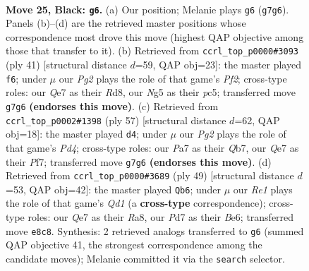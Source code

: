 \documentclass[11pt]{article}
\begin{document}
\clearpage

\begin{figure}[p]\centering
\begin{subfigure}{0.46\textwidth}\centering
\resizebox{\linewidth}{!}{%
\newchessgame
\chessboard[
  setfen={4r1k1/p1ppq1pp/5p2/6nB/1pPP4/P2Q4/2P2P1P/1R4K1 b - - 2 25},
  showmover=false,
  pgfstyle=straightmove, color=movearrow, markmove={g7-g6}
]}
\caption{}
\end{subfigure}\hfill
\begin{subfigure}{0.46\textwidth}\centering
\resizebox{\linewidth}{!}{%
\newchessgame
\chessboard[
  setfen={2kr4/1pq2p1p/p3p2B/2P1n1p1/8/8/PP2QPPP/R5K1 b - - 1 21},
  showmover=false,
  pgfstyle=straightmove, color=movearrow, markmove={f7-f6}
]}
\caption{}
\end{subfigure}
\\[4pt]
\begin{subfigure}{0.46\textwidth}\centering
\resizebox{\linewidth}{!}{%
\newchessgame
\chessboard[
  setfen={4r1k1/1q3p1p/1p4p1/p2p1n2/8/4P3/PPQ2PPP/3RB1K1 b - - 2 29},
  showmover=false,
  pgfstyle=straightmove, color=movearrow, markmove={d5-d4}
]}
\caption{}
\end{subfigure}\hfill
\begin{subfigure}{0.46\textwidth}\centering
\resizebox{\linewidth}{!}{%
\newchessgame
\chessboard[
  setfen={r2q2k1/1p2pp2/4b1p1/p6p/1P5P/P1Q1P3/4BPP1/3R2K1 b - - 1 25},
  showmover=false,
  pgfstyle=straightmove, color=movearrow, markmove={d8-b6}
]}
\caption{}
\end{subfigure}
\caption{\textbf{Move 25, Black: \texttt{g6}.} (a) Our position; Melanie plays \texttt{g6} (\texttt{g7g6}). Panels (b)--(d) are the retrieved master positions whose correspondence most drove this move (highest QAP objective among those that transfer to it). (b) Retrieved from \texttt{ccrl\_top\_p0000\#3093} (ply 41) [structural distance $d$=59, QAP obj=23]: the master played \texttt{f6}; under $\mu$ our \emph{Pg2} plays the role of that game's \emph{Pf2}; cross-type roles: our \emph{Q}e7 as their \emph{R}d8, our \emph{N}g5 as their \emph{p}c5; transferred move \texttt{g7g6} \textbf{(endorses this move)}. (c) Retrieved from \texttt{ccrl\_top\_p0002\#1398} (ply 57) [structural distance $d$=62, QAP obj=18]: the master played \texttt{d4}; under $\mu$ our \emph{Pg2} plays the role of that game's \emph{Pd4}; cross-type roles: our \emph{P}a7 as their \emph{Q}b7, our \emph{Q}e7 as their \emph{P}f7; transferred move \texttt{g7g6} \textbf{(endorses this move)}. (d) Retrieved from \texttt{ccrl\_top\_p0000\#3689} (ply 49) [structural distance $d$=53, QAP obj=42]: the master played \texttt{Qb6}; under $\mu$ our \emph{Re1} plays the role of that game's \emph{Qd1} (a \textbf{cross-type} correspondence); cross-type roles: our \emph{Q}e7 as their \emph{R}a8, our \emph{P}d7 as their \emph{B}e6; transferred move \texttt{e8c8}. Synthesis: 2 retrieved analogs transferred to \texttt{g6} (summed QAP objective 41, the strongest correspondence among the candidate moves); Melanie committed it via the \texttt{search} selector.}
\label{fig:thought-m49}
\end{figure}
\end{document}
